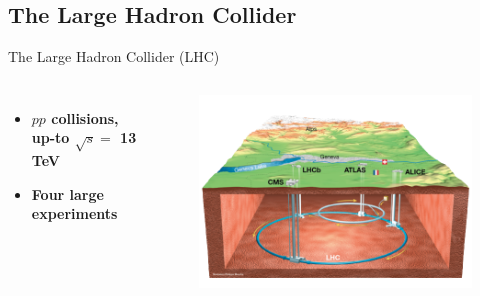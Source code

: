 \subsection{The Large Hadron Collider}
\begin{frame}{The Large Hadron Collider (LHC)}
\begin{columns}

\begin{itemize}
    \item \textbf{\textcolor{structurColor}{$pp$ collisions,} up-to $\sqrt{s} = $ 13 TeV}
    \item\textbf{Four large experiments} 
\end{itemize}
\begin{figure}
        \centering
        \includegraphics[width=1.1\textwidth]{Part2/Img/b_RTU_a_schematic_depiction_of_the_lhc-removebg-preview.png}
\end{figure}    
\end{columns}

\end{frame}

